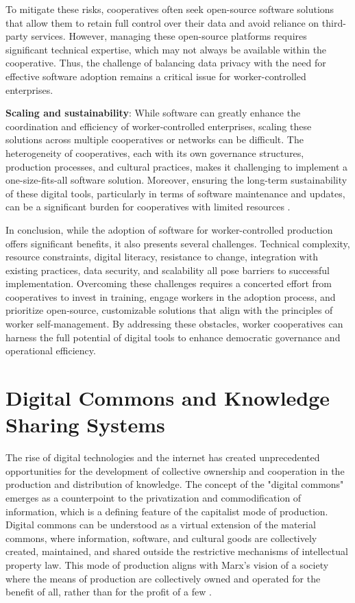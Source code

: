 \begin{refsection}
To mitigate these risks, cooperatives often seek open-source software solutions that allow them to retain full control over their data and avoid reliance on third-party services. However, managing these open-source platforms requires significant technical expertise, which may not always be available within the cooperative. Thus, the challenge of balancing data privacy with the need for effective software adoption remains a critical issue for worker-controlled enterprises.

\textbf{Scaling and sustainability}: While software can greatly enhance the coordination and efficiency of worker-controlled enterprises, scaling these solutions across multiple cooperatives or networks can be difficult. The heterogeneity of cooperatives, each with its own governance structures, production processes, and cultural practices, makes it challenging to implement a one-size-fits-all software solution. Moreover, ensuring the long-term sustainability of these digital tools, particularly in terms of software maintenance and updates, can be a significant burden for cooperatives with limited resources \cite[pp.~137-140]{gago2017}.

In conclusion, while the adoption of software for worker-controlled production offers significant benefits, it also presents several challenges. Technical complexity, resource constraints, digital literacy, resistance to change, integration with existing practices, data security, and scalability all pose barriers to successful implementation. Overcoming these challenges requires a concerted effort from cooperatives to invest in training, engage workers in the adoption process, and prioritize open-source, customizable solutions that align with the principles of worker self-management. By addressing these obstacles, worker cooperatives can harness the full potential of digital tools to enhance democratic governance and operational efficiency.

\section{Digital Commons and Knowledge Sharing Systems}

The rise of digital technologies and the internet has created unprecedented opportunities for the development of collective ownership and cooperation in the production and distribution of knowledge. The concept of the "digital commons" emerges as a counterpoint to the privatization and commodification of information, which is a defining feature of the capitalist mode of production. Digital commons can be understood as a virtual extension of the material commons, where information, software, and cultural goods are collectively created, maintained, and shared outside the restrictive mechanisms of intellectual property law. This mode of production aligns with Marx’s vision of a society where the means of production are collectively owned and operated for the benefit of all, rather than for the profit of a few \cite[pp.~45]{marx2008}.


\end{refsection}
